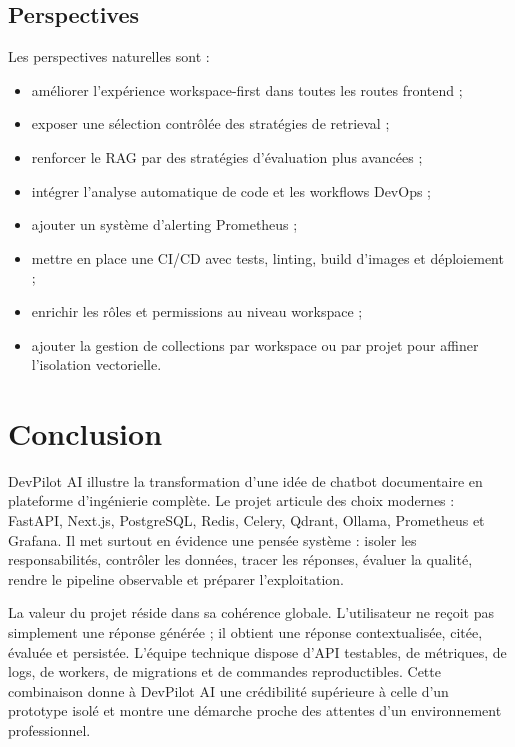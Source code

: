 \documentclass[12pt,a4paper,oneside]{report}
\begin{document}
\section{Perspectives}
Les perspectives naturelles sont :
\begin{itemize}
  \item améliorer l'expérience workspace-first dans toutes les routes frontend ;
  \item exposer une sélection contrôlée des stratégies de retrieval ;
  \item renforcer le RAG par des stratégies d'évaluation plus avancées ;
  \item intégrer l'analyse automatique de code et les workflows DevOps ;
  \item ajouter un système d'alerting Prometheus ;
  \item mettre en place une CI/CD avec tests, linting, build d'images et déploiement ;
  \item enrichir les rôles et permissions au niveau workspace ;
  \item ajouter la gestion de collections par workspace ou par projet pour affiner l'isolation vectorielle.
\end{itemize}

\chapter{Conclusion}
DevPilot AI illustre la transformation d'une idée de chatbot documentaire en plateforme d'ingénierie complète. Le projet articule des choix modernes : FastAPI, Next.js, PostgreSQL, Redis, Celery, Qdrant, Ollama, Prometheus et Grafana. Il met surtout en évidence une pensée système : isoler les responsabilités, contrôler les données, tracer les réponses, évaluer la qualité, rendre le pipeline observable et préparer l'exploitation.

La valeur du projet réside dans sa cohérence globale. L'utilisateur ne reçoit pas simplement une réponse générée ; il obtient une réponse contextualisée, citée, évaluée et persistée. L'équipe technique dispose d'API testables, de métriques, de logs, de workers, de migrations et de commandes reproductibles. Cette combinaison donne à DevPilot AI une crédibilité supérieure à celle d'un prototype isolé et montre une démarche proche des attentes d'un environnement professionnel.

\appendix
\end{document}
